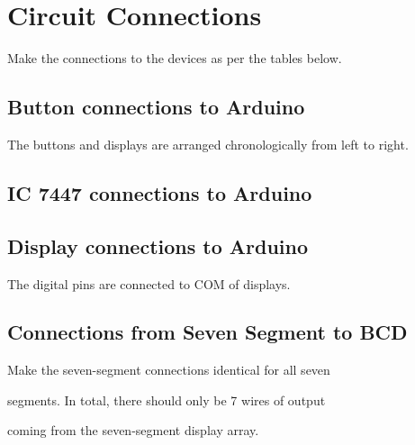 \section{Circuit Connections}
\raggedright
Make the connections to the devices as per the tables below.
\begin{centering}
\subsection{Button connections to Arduino}
\end{centering}
\raggedright
The buttons and displays are arranged chronologically from left to right.\\
\vspace{0.25cm}


\subsection{IC 7447 connections to Arduino}
\raggedright
\vspace{0.25cm}


\subsection{Display connections to Arduino}
\raggedright
The digital pins are connected to COM of displays.\\
\vspace{0.25cm}


\subsection{Connections from Seven Segment to BCD}
\raggedright
Make the seven-segment connections identical for all seven\\ \raggedright segments. In total, there should only be 7 wires of output\\ \raggedright coming from the seven-segment display array.\\
\vspace{0.25cm}

